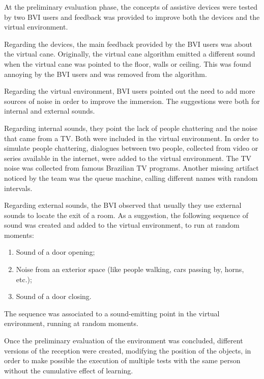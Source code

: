         At the preliminary evaluation phase, the concepts of assistive devices were tested by two BVI users and feedback was provided to improve both the devices and the virtual environment. 

        Regarding the devices, the main feedback provided by the BVI users was about the virtual cane. Originally, the virtual cane algorithm emitted a different sound when the virtual cane was pointed to the floor, walls or ceiling. This was found annoying by the BVI users and was removed from the algorithm.

        Regarding the virtual environment, BVI users pointed out the need to add more sources of noise in order to improve the immersion. The suggestions were both for internal and external sounds.
        
        Regarding internal sounds, they point the lack of people chattering and the noise that came from a TV. Both were included in the virtual environment. In order to simulate people chattering, dialogues between two people, collected from video or series available in the internet, were added to the virtual environment. The TV noise was collected from famous Brazilian TV programs. Another missing artifact noticed by the team was the queue machine, calling different names with random intervals. 

        Regarding external sounds, the BVI observed that usually they use external sounds to locate the exit of a room. As a suggestion, the following sequence of sound was created and added to the virtual environment, to run at random moments:

        \begin{enumerate}
            \item Sound of a door opening;
            \item Noise from an exterior space (like people walking, cars passing by, horns, etc.);
            \item Sound of a door closing.
        \end{enumerate}
        
        The sequence was associated to a sound-emitting point in the virtual environment, running at random moments. 

        Once the preliminary evaluation of the environment was concluded, different versions of the reception were created, modifying the position of the objects, in order to make possible the execution of multiple tests with the same person without the cumulative effect of learning. 

